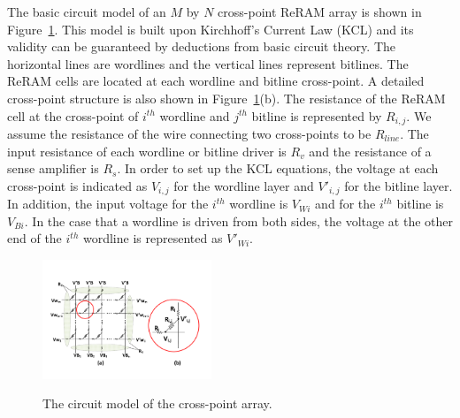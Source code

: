 The basic circuit model of an $M$ by $N$ cross-point ReRAM array is shown
in Figure~\ref{fig:modeling}. This model is built upon Kirchhoff's Current
Law (KCL) and its validity can be guaranteed by deductions from basic
circuit theory. The horizontal lines are wordlines and the vertical lines
represent bitlines. The ReRAM cells are located at each wordline and
bitline cross-point. A detailed cross-point structure is also shown in
Figure~\ref{fig:modeling}(b). The resistance of the ReRAM cell at the
cross-point of $i^{th}$ wordline and $j^{th}$ bitline is represented by
$R_{i,j}$. We assume the resistance of the wire connecting two
cross-points to be $R_{line}$. The input resistance of each wordline or
bitline driver is $R_v$ and the resistance of a sense amplifier is $R_s$.
In order to set up the KCL equations, the voltage at each cross-point is
indicated as $V_{i,j}$ for the wordline layer and $V'_{i,j}$ for the
bitline layer. In addition, the input voltage for the $i^{th}$ wordline is
$V_{Wi}$ and for the $i^{th}$ bitline is $V_{Bi}$. In the case that a
wordline is driven from both sides, the voltage at the other end of the
$i^{th}$ wordline is represented as $V'_{Wi}$.


\begin{figure}%
\centering
  \includegraphics[width=0.45\textwidth]{./figures/model_f.pdf}\\
  \vspace{-8pt}
  \caption{The circuit model of the cross-point array.}\label{fig:modeling}
  \vspace{-4pt}
\end{figure}

